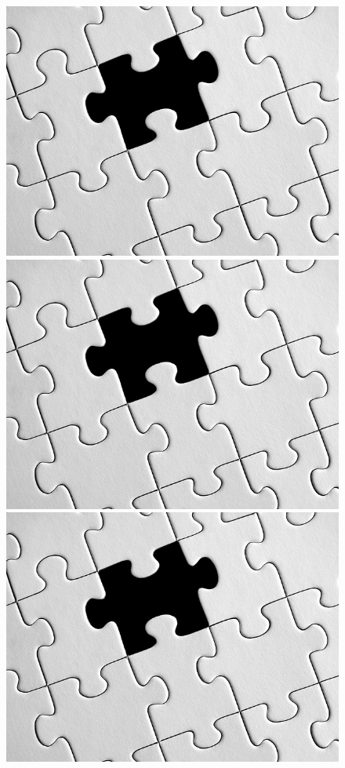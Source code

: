 \begin{figure}[H]
\begin{minipage}[b]{.11\linewidth}
		\includegraphics[width=\linewidth]{../data/missing.jpg}
	\end{minipage}
	\begin{minipage}[b]{.11\linewidth}
		\centering
		\includegraphics[width=\linewidth]{../data/missing.jpg}
	\end{minipage}
	\begin{minipage}[b]{.11\linewidth}
		\centering
		\includegraphics[width=\linewidth]{../data/missing.jpg}

\end{minipage}
\end{figure}

